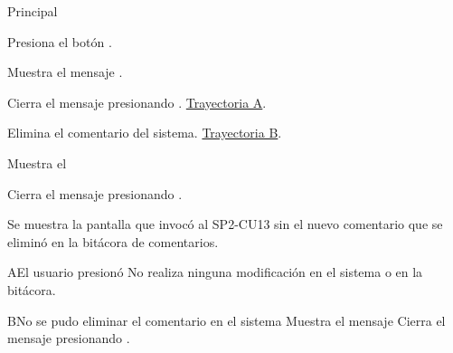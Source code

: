 \begin{UCtrayectoria}{Principal}


    \UCpaso[\UCactor] Presiona el botón . 
    
    \UCpaso Muestra el mensaje .

    \UCpaso[\UCactor] Cierra el mensaje presionando . \hyperlink{SP2-CU13-A}{Trayectoria A}.
    
    \UCpaso Elimina el comentario del sistema. \hyperlink{SP2-CU13-B}{Trayectoria B}.
    
    \UCpaso Muestra el 

    \UCpaso[\UCactor] Cierra el mensaje presionando .

     \UCpaso Se muestra la pantalla que invocó al SP2-CU13 sin el nuevo comentario que se eliminó en la bitácora de comentarios. 


\end{UCtrayectoria}


\begin{UCtrayectoriaA}{A}{El usuario presionó }
    \hypertarget{SP2-CU13-A}{}
  \UCpaso No realiza ninguna modificación en el sistema o en la bitácora.
\end{UCtrayectoriaA}

\begin{UCtrayectoriaA}{B}{No se pudo eliminar el comentario en el sistema}
    \hypertarget{SP2-CU13-B}{}
  \UCpaso Muestra el mensaje 
  \UCpaso[\UCactor] Cierra el mensaje presionando .
\end{UCtrayectoriaA}
